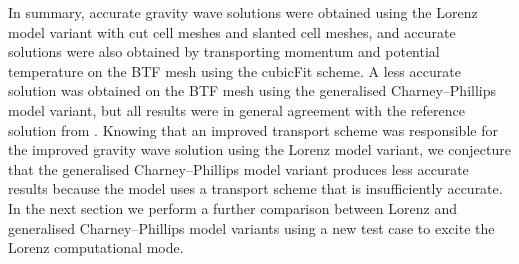 In summary, accurate gravity wave solutions were obtained using the Lorenz model variant with cut cell meshes and slanted cell meshes, and accurate solutions were also obtained by transporting momentum and potential temperature on the BTF mesh using the cubicFit scheme.
A less accurate solution was obtained on the BTF mesh using the generalised Charney--Phillips model variant, but all results were in general agreement with the reference solution from \citet{melvin2010}.
Knowing that an improved transport scheme was responsible for the improved gravity wave solution using the Lorenz model variant, we conjecture that the generalised Charney--Phillips model variant produces less accurate results because the model uses a transport scheme that is insufficiently accurate.
In the next section we perform a further comparison between Lorenz and generalised Charney--Phillips model variants using a new test case to excite the Lorenz computational mode.

